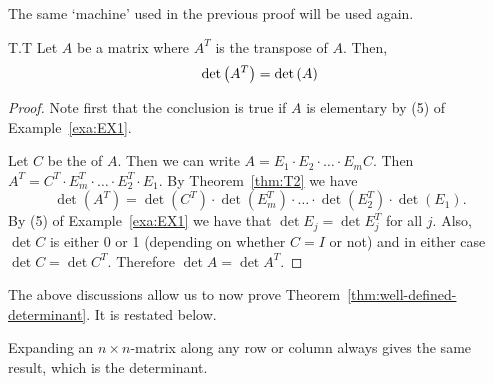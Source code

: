 The same `machine' used in the previous proof will be used again. 

\begin{theorem}{}{T.T} 
Let $A$ be a matrix where $A^T$ is the transpose of $A$. Then,
\begin{equation*}
\det\left(A^T\right) = \det \left(A \right)
\end{equation*}
\end{theorem} 

\begin{proof} 
Note first that the conclusion is true if $A$ is elementary by (5) of Example~\ref{exa:EX1}. 

Let $C$ be the {\rref} of $A$. Then we can write 
$A= E_1\cdot E_2\cdot \dots\cdot E_m C$. 
Then $A^T=C^T\cdot E_m^T\cdot \dots \cdot E_2^T\cdot E_1$. 
By Theorem~\ref{thm:T2} we have 
\[
\det (A^T)=\det (C^T)\cdot \det (E_m^T)\cdot \dots \cdot \det (E_2^T)\cdot \det(E_1).
\] 
By (5) of Example~\ref{exa:EX1} we have that $\det E_j=\det E_j^T$ for all $j$. 
Also, $\det C$ is either 0 or 1 (depending on whether $C=I$ or not) and in either 
case $\det C=\det C^T$. Therefore $\det A=\det A^T$. 
\end{proof} 

The above discussions allow us to now prove Theorem~\ref{thm:well-defined-determinant}. It is restated below. 
 
\begin{theorem}{}{}
Expanding an $n\times n$-matrix along any row or column always gives the same result, which is the determinant. 
\end{theorem} 

